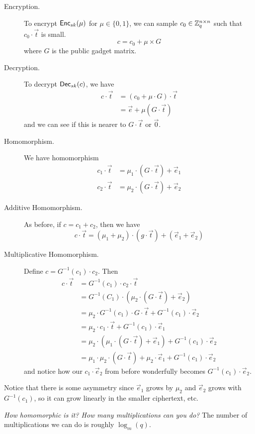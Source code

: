 \begin{description}
    \item[Encryption.] To encrypt $\operatorname{\mathsf{Enc}}_{sk}(\mu)$ for $\mu\in \{0, 1\}$, we can sample $c_0\in \mathbb Z_q^{n\times n}$ such that $c_0\cdot\vec{t}$ is small.
        \[c = c_0 + \mu\times G\]
        where $G$ is the public gadget matrix.
    \item[Decryption.] To decrypt $\operatorname{\mathsf{Dec}}_{sk}(c)$, we have
        \begin{align*}
            c\cdot\vec{t} & = (c_0 + \mu\cdot G)\cdot \vec{t} \\
                          & = \vec{e} + \mu(G\cdot \vec{t})
        \end{align*}
        and we can see if this is nearer to $G\cdot \vec{t}$ or $\vec{0}$.
    \item[Homomorphism.] We have homomorphism
        \begin{align*}
            c_1\cdot \vec{t} & = \mu_1 \cdot (G\cdot \vec{t}) + \vec{e}_1 \\
            c_2\cdot \vec{t} & = \mu_2 \cdot (G\cdot \vec{t}) + \vec{e}_2
        \end{align*}
    \item[Additive Homomorphism.] As before, if $c = c_1 + c_2$, then we have
        \[c\cdot \vec{t} = (\mu_1 + \mu_2)\cdot (g\cdot \vec{t}) + (\vec{e}_1 + \vec{e}_2)\]
    \item[Multiplicative Homomorphism.] Define $c = G^{-1}(c_1)\cdot c_2$. Then
        \begin{align*}
            c\cdot \vec{t} & = G^{-1}(c_1)\cdot c_2 \cdot \vec{t}                                                             \\
                           & = G^{-1}(C_1)\cdot (\mu_2\cdot (G\cdot \vec{t}) + \vec{e}_2)                                     \\
                           & = \mu_2\cdot G^{-1}(c_1)\cdot G\cdot \vec{t} + G^{-1}(c_1)\cdot \vec{e}_2                        \\
                           & = \mu_2\cdot c_1\cdot \vec{t} + G^{-1}(c_1)\cdot \vec{e}_1                                       \\
                           & = \mu_2\cdot \left( \mu_1\cdot (G\cdot \vec{t}) + \vec{e}_1 \right) + G^{-1}(c_1)\cdot \vec{e}_2 \\
                           & = \mu_1\cdot \mu_2\cdot (G\cdot \vec{t}) + \mu_2\cdot \vec{e}_1 + G^{-1}(c_1)\cdot\vec{e}_2
        \end{align*}
        and notice how our $c_1\cdot \vec{e}_2$ from before wonderfully becomes $G^{-1}(c_1)\cdot \vec{e}_2$.
\end{description}

Notice that there is some asymmetry since $\vec{e}_1$ grows by $\mu_2$ and $\vec{e}_2$ grows with $G^{-1}(c_1)$, so it can grow linearly in the smaller ciphertext, etc.

\emph{How homomorphic is it? How many multiplications can you do?} The number of multiplications we can do is roughly $\log_m(q)$.